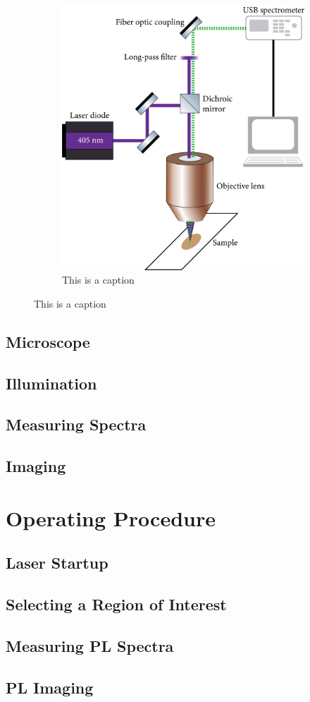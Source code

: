 \begin{figure}[h]
\begin{subfigure}{.5\textwidth}
        \includegraphics[width=\textwidth]{img/optical-diagram.png}
        \caption{This is a caption}
        \label{img:equipment-photo}
    \end{subfigure}
\end{figure}

\subsection{Microscope}
\subsection{Illumination}
\subsection{Measuring Spectra}
\subsection{Imaging}

\section{Operating Procedure}
\subsection{Laser Startup} %
\subsection{Selecting a Region of Interest}
\subsection{Measuring PL Spectra}
\subsection{PL Imaging}